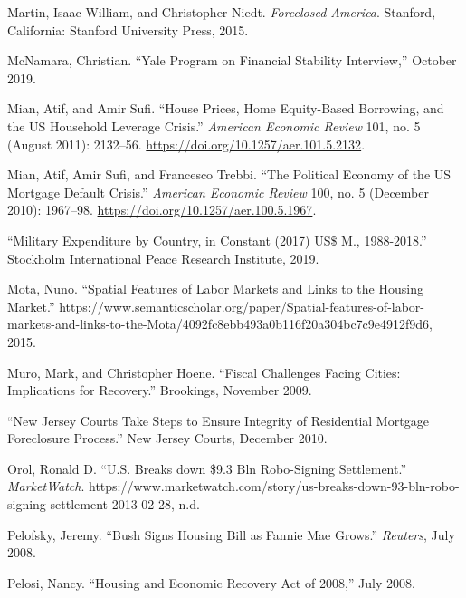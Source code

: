 \documentclass[12pt,oneside]{psthesis}
\begin{document}
\leavevmode\hypertarget{ref-martin2015foreclosed}{}%
Martin, Isaac William, and Christopher Niedt. \emph{Foreclosed America}. Stanford, California: Stanford University Press, 2015.

\leavevmode\hypertarget{ref-mcnamara2019yale}{}%
McNamara, Christian. ``Yale Program on Financial Stability Interview,'' October 2019.

\leavevmode\hypertarget{ref-mian2011house}{}%
Mian, Atif, and Amir Sufi. ``House Prices, Home Equity-Based Borrowing, and the US Household Leverage Crisis.'' \emph{American Economic Review} 101, no. 5 (August 2011): 2132--56. \url{https://doi.org/10.1257/aer.101.5.2132}.

\leavevmode\hypertarget{ref-mianPoliticalEconomyUS2010}{}%
Mian, Atif, Amir Sufi, and Francesco Trebbi. ``The Political Economy of the US Mortgage Default Crisis.'' \emph{American Economic Review} 100, no. 5 (December 2010): 1967--98. \url{https://doi.org/10.1257/aer.100.5.1967}.

\leavevmode\hypertarget{ref-2019military}{}%
``Military Expenditure by Country, in Constant (2017) US\$ M., 1988-2018.'' Stockholm International Peace Research Institute, 2019.

\leavevmode\hypertarget{ref-mota2015spatial}{}%
Mota, Nuno. ``Spatial Features of Labor Markets and Links to the Housing Market.'' https://www.semanticscholar.org/paper/Spatial-features-of-labor-markets-and-links-to-the-Mota/4092fc8ebb493a0b116f20a304bc7c9e4912f9d6, 2015.

\leavevmode\hypertarget{ref-muro2009fiscal}{}%
Muro, Mark, and Christopher Hoene. ``Fiscal Challenges Facing Cities: Implications for Recovery.'' Brookings, November 2009.

\leavevmode\hypertarget{ref-comfort2010new}{}%
``New Jersey Courts Take Steps to Ensure Integrity of Residential Mortgage Foreclosure Process.'' New Jersey Courts, December 2010.

\leavevmode\hypertarget{ref-orolbreaks}{}%
Orol, Ronald D. ``U.S. Breaks down \$9.3 Bln Robo-Signing Settlement.'' \emph{MarketWatch}. https://www.marketwatch.com/story/us-breaks-down-93-bln-robo-signing-settlement-2013-02-28, n.d.

\leavevmode\hypertarget{ref-pelofsky2008bush}{}%
Pelofsky, Jeremy. ``Bush Signs Housing Bill as Fannie Mae Grows.'' \emph{Reuters}, July 2008.

\leavevmode\hypertarget{ref-pelosi2008housing}{}%
Pelosi, Nancy. ``Housing and Economic Recovery Act of 2008,'' July 2008.
\end{document}
